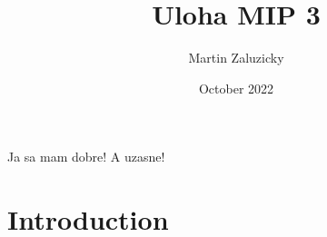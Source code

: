 \documentclass{article}
\title{Uloha MIP 3}
\author{Martin Zaluzicky}
\date{October 2022}
\begin{document}
Ja sa mam dobre!
A uzasne!
\maketitle

\section{Introduction}
\end{document}
